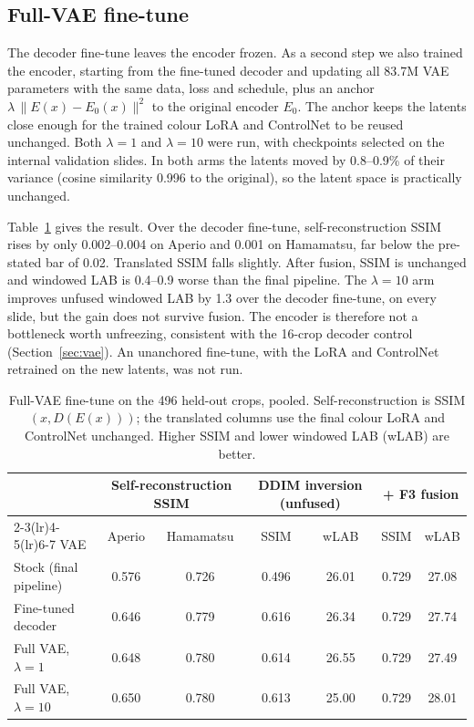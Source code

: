 \subsection{Full-VAE fine-tune}
\label{app:fullvae}
The decoder fine-tune leaves the encoder frozen. As a second step we also trained the encoder, starting from the
fine-tuned decoder and updating all 83.7M VAE parameters with the same data, loss and schedule, plus an anchor
$\lambda\,\lVert E(x)-E_0(x)\rVert^2$ to the original encoder $E_0$. The anchor keeps the latents close enough for
the trained colour LoRA and ControlNet to be reused unchanged. Both $\lambda=1$ and $\lambda=10$ were run, with
checkpoints selected on the internal validation slides. In both arms the latents moved by 0.8--0.9\% of their
variance (cosine similarity 0.996 to the original), so the latent space is practically unchanged.

Table~\ref{tab:app-fullvae} gives the result. Over the decoder fine-tune, self-reconstruction SSIM rises by only
0.002--0.004 on Aperio and 0.001 on Hamamatsu, far below the pre-stated bar of 0.02. Translated SSIM falls
slightly. After fusion, SSIM is unchanged and windowed LAB is 0.4--0.9 worse than the final pipeline. The
$\lambda=10$ arm improves unfused windowed LAB by 1.3 over the decoder fine-tune, on every slide, but the gain does
not survive fusion. The encoder is therefore not a bottleneck worth unfreezing, consistent with the 16-crop
decoder control (Section~\ref{sec:vae}). An unanchored fine-tune, with the LoRA and ControlNet retrained on the new
latents, was not run.

\begin{table}[!tbp]
\centering
\caption{Full-VAE fine-tune on the 496 held-out crops, pooled. Self-reconstruction is SSIM$(x,D(E(x)))$; the
translated columns use the final colour LoRA and ControlNet unchanged. Higher SSIM and lower windowed LAB (wLAB)
are better.}
\label{tab:app-fullvae}
\footnotesize
\begin{tabular}{lcccccc}
\toprule
& \multicolumn{2}{c}{Self-reconstruction SSIM} & \multicolumn{2}{c}{DDIM inversion (unfused)} & \multicolumn{2}{c}{+ F3 fusion}\\
\cmidrule(lr){2-3}\cmidrule(lr){4-5}\cmidrule(lr){6-7}
VAE & Aperio & Hamamatsu & SSIM & wLAB & SSIM & wLAB\\
\midrule
Stock (final pipeline) & 0.576 & 0.726 & 0.496 & 26.01 & 0.729 & 27.08\\
Fine-tuned decoder & 0.646 & 0.779 & 0.616 & 26.34 & 0.729 & 27.74\\
Full VAE, $\lambda=1$ & 0.648 & 0.780 & 0.614 & 26.55 & 0.729 & 27.49\\
Full VAE, $\lambda=10$ & 0.650 & 0.780 & 0.613 & 25.00 & 0.729 & 28.01\\
\bottomrule
\end{tabular}
\end{table}

